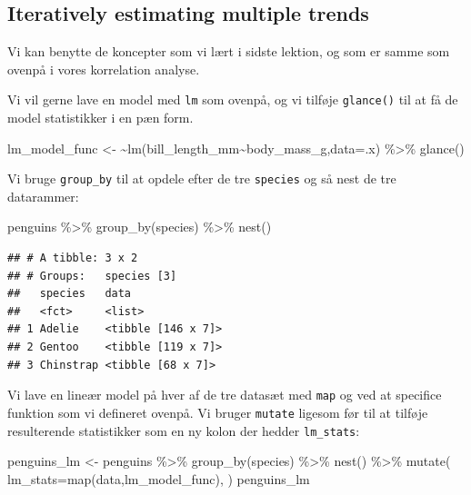 \documentclass[
]{book}
\newenvironment{Shaded}{\begin{snugshade}}{\end{snugshade}}
\newcommand{\AttributeTok}[1]{\textcolor[rgb]{0.77,0.63,0.00}{#1}}
\newcommand{\ErrorTok}[1]{\textcolor[rgb]{0.64,0.00,0.00}{\textbf{#1}}}
\newcommand{\FunctionTok}[1]{\textcolor[rgb]{0.00,0.00,0.00}{#1}}
\newcommand{\NormalTok}[1]{#1}
\newcommand{\OtherTok}[1]{\textcolor[rgb]{0.56,0.35,0.01}{#1}}
\newcommand{\SpecialCharTok}[1]{\textcolor[rgb]{0.00,0.00,0.00}{#1}}
\begin{document}
\hypertarget{iteratively-estimating-multiple-trends}{%
\subsection{Iteratively estimating multiple trends}\label{iteratively-estimating-multiple-trends}}

Vi kan benytte de koncepter som vi lært i sidste lektion, og som er samme som ovenpå i vores korrelation analyse.

Vi vil gerne lave en model med \texttt{lm} som ovenpå, og vi tilføje \texttt{glance()} til at få de model statistikker i en pæn form.

\begin{Shaded}
\begin{Highlighting}[]
\NormalTok{lm\_model\_func }\OtherTok{\textless{}{-}} \ErrorTok{\textasciitilde{}}\FunctionTok{lm}\NormalTok{(bill\_length\_mm}\SpecialCharTok{\textasciitilde{}}\NormalTok{body\_mass\_g,}\AttributeTok{data=}\NormalTok{.x) }\SpecialCharTok{\%\textgreater{}\%} \FunctionTok{glance}\NormalTok{()}
\end{Highlighting}
\end{Shaded}

Vi bruge \texttt{group\_by} til at opdele efter de tre \texttt{species} og så nest de tre datarammer:

\begin{Shaded}
\begin{Highlighting}[]
\NormalTok{penguins }\SpecialCharTok{\%\textgreater{}\%} 
  \FunctionTok{group\_by}\NormalTok{(species) }\SpecialCharTok{\%\textgreater{}\%}
  \FunctionTok{nest}\NormalTok{()}
\end{Highlighting}
\end{Shaded}

\begin{verbatim}
## # A tibble: 3 x 2
## # Groups:   species [3]
##   species   data              
##   <fct>     <list>            
## 1 Adelie    <tibble [146 x 7]>
## 2 Gentoo    <tibble [119 x 7]>
## 3 Chinstrap <tibble [68 x 7]>
\end{verbatim}

Vi lave en lineær model på hver af de tre datasæt med \texttt{map} og ved at specifice funktion som vi defineret ovenpå. Vi bruger \texttt{mutate} ligesom før til at tilføje resulterende statistikker som en ny kolon der hedder \texttt{lm\_stats}:

\begin{Shaded}
\begin{Highlighting}[]
\NormalTok{penguins\_lm }\OtherTok{\textless{}{-}}\NormalTok{ penguins }\SpecialCharTok{\%\textgreater{}\%} 
  \FunctionTok{group\_by}\NormalTok{(species) }\SpecialCharTok{\%\textgreater{}\%}
  \FunctionTok{nest}\NormalTok{() }\SpecialCharTok{\%\textgreater{}\%} 
  \FunctionTok{mutate}\NormalTok{(}
    \AttributeTok{lm\_stats=}\FunctionTok{map}\NormalTok{(data,lm\_model\_func),}
\NormalTok{    )}
\NormalTok{penguins\_lm}
\end{Highlighting}
\end{Shaded}
\end{document}
